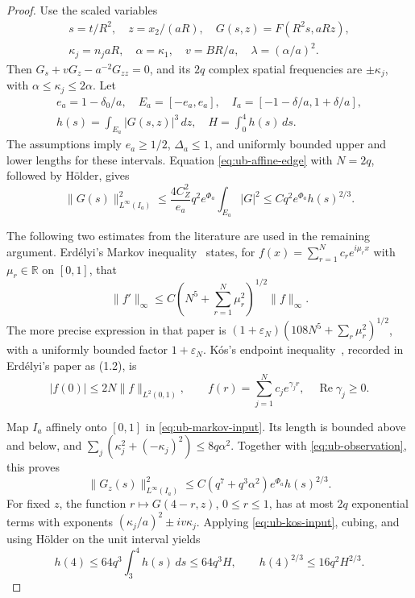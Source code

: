 \begin{proof}
Use the scaled variables
\[
 \begin{gathered}
 s=t/R^2,\quad z=x_2/(aR),\quad G(s,z)=F(R^2s,aRz),\\
 \kappa_j=n_jaR,\quad \alpha=\kappa_1,\quad
 v=BR/a,\quad\lambda=(\alpha/a)^2.
 \end{gathered}
\]
Then $G_s+vG_z-a^{-2}G_{zz}=0$, and its $2q$ complex spatial
frequencies are $\pm\kappa_j$, with $\alpha\le\kappa_j\le2\alpha$.
Let
\[
 \begin{gathered}
 e_a=1-\delta_0/a,\quad E_a=[-e_a,e_a],\quad
 I_a=[-1-\delta/a,1+\delta/a],\\
 h(s)=\int_{E_a}|G(s,z)|^3\,dz,\quad H=\int_0^4h(s)\,ds.
 \end{gathered}
\]
The assumptions imply $e_a\ge1/2$, $\Delta_a\le1$, and uniformly
bounded upper and lower lengths for these intervals.
Equation \eqref{eq:ub-affine-edge} with $N=2q$, followed by H\"older,
gives
\begin{equation}\label{eq:ub-observation}
 \|G(s)\|_{L^\infty(I_a)}^2
 \le\frac{4C_Z^2}{e_a}q^2e^{\Phi_a}\int_{E_a}|G|^2
 \le Cq^2e^{\Phi_a}h(s)^{2/3}.
\end{equation}

The following two estimates from the literature are used in the remaining
argument.  Erd\'elyi's Markov inequality~\cite[Theorem 9.1, arXiv v1]{Erdelyi2017} states, for
$f(x)=\sum_{r=1}^N c_re^{i\mu_rx}$ with $\mu_r\in\mathbb R$ on $[0,1]$, that
\begin{equation}\label{eq:ub-markov-input}
 \|f'\|_\infty\le C
       \left(N^5+\sum_{r=1}^N\mu_r^2\right)^{1/2}\|f\|_\infty.
\end{equation}
The more precise expression in that paper is
$(1+\varepsilon_N)(108N^5+\sum_r\mu_r^2)^{1/2}$, with a uniformly
bounded factor $1+\varepsilon_N$.
K\'os's endpoint inequality~\cite{Kos2008}, recorded in
Erd\'elyi's paper as (1.2), is
\begin{equation}\label{eq:ub-kos-input}
 |f(0)|\le2N\|f\|_{L^2(0,1)},\qquad
 f(r)=\sum_{j=1}^N c_je^{\gamma_jr},\quad
 \operatorname{Re}\gamma_j\ge0.
\end{equation}

Map $I_a$ affinely onto $[0,1]$ in
\eqref{eq:ub-markov-input}.  Its length is bounded above and below,
and $\sum_j(\kappa_j^2+(-\kappa_j)^2)\le8q\alpha^2$.
Together with \eqref{eq:ub-observation}, this proves
\begin{equation}\label{eq:ub-derivative}
 \|G_z(s)\|_{L^\infty(I_a)}^2
 \le C(q^7+q^3\alpha^2)e^{\Phi_a}h(s)^{2/3}.
\end{equation}
For fixed $z$, the function $r\mapsto G(4-r,z)$, $0\le r\le1$,
has at most $2q$ exponential terms with exponents
$(\kappa_j/a)^2\pm iv\kappa_j$.  Applying
\eqref{eq:ub-kos-input}, cubing, and using H\"older on the unit
interval yields
\begin{equation}\label{eq:ub-endpoint}
 h(4)\le64q^3\int_3^4h(s)\,ds\le64q^3H,
 \qquad h(4)^{2/3}\le16q^2H^{2/3}.
\end{equation}


\end{proof}
